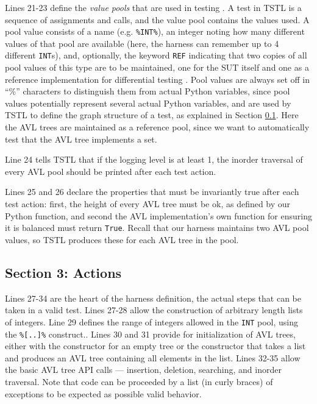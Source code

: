 \documentclass{sig-alternate}
\begin{document}
Lines 21-23 define the \emph{value pools} that are used in testing
\cite{AndrewsTR,UDITA}.  A test in TSTL is a sequence of assignments
and calls, and the value pool contains the values used.  A pool value
consists of a name (e.g. {\tt \%INT\%}), an integer noting how many
different values of that pool are available (here, the harness can
remember up to 4 different {\tt INT}s), and, optionally, the keyword
{\tt REF} indicating that two copies of all pool values of this type
are to be maintained, one for the SUT itself and one as a reference
implementation for differential testing \cite{Differential,ICSEDiff}.
Pool values are always set off in ``\%'' characters to distinguish
them from actual Python variables, since pool values potentially
represent several actual Python variables, and are used by TSTL to
define the graph structure of a test, as explained in Section \ref{sec:actions}.
Here the AVL trees are maintained as a reference pool, since we want
to automatically test that the AVL tree implements a set.

Line 24 tells TSTL that if the logging level is at least 1, the
inorder traversal of every AVL pool should be printed after each test
action.

Lines 25 and 26 declare the properties that must be invariantly true
after each test action: first, the height of every AVL tree must be
ok, as defined by our Python function, and second the AVL
implementation's own function for ensuring it is balanced must return
{\tt True}.  Recall that our harness maintains two AVL pool values, so
TSTL produces these for each AVL tree in the pool.

\subsection{Section 3: Actions}
\label{sec:actions}

Lines 27-34 are the heart of the harness definition, the actual steps
that can be taken in a valid test.  Lines 27-28 allow the construction
of arbitrary length lists of integers.  Line 29 defines the range of
integers allowed in the {\tt INT} pool, using the {\tt \%[..]\%}
construct..  Lines 30 and 31 provide for initialization of AVL trees,
either with the constructor for an empty tree or the constructor that
takes a list and produces an AVL tree containing all elements in the
list.  Lines 32-35 allow the basic AVL tree API calls --- insertion,
deletion, searching, and inorder traversal.  Note that code can be
proceeded by a list (in curly braces) of exceptions to be expected as possible valid
behavior.
\end{document}
